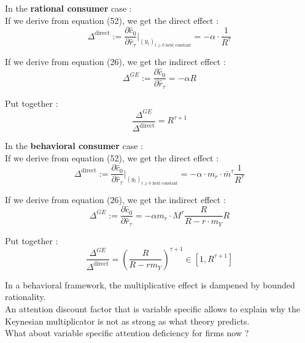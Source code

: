 \documentclass{beamer}
\begin{document}
\begin{frame}{\subsecname}
    In the \textbf{rational consumer} case : \\

    If we derive from equation (52), we get the direct effect : 
    \begin{equation*}
        \Delta^{\text{direct}}:=\frac{\partial \hat{c}_{0}}{\partial \hat{r}_{\tau}}\bigg\rvert_{(y_{t})_{t\geq0 \text{ held constant}}} = -\alpha\cdot \frac{1}{R^{\tau}}
    \end{equation*}
    
    If we derive from equation (26), we get the indirect effect :
    \begin{equation*}
        \Delta^{GE}:=\frac{\partial \hat{c}_{0}}{\partial \hat{r}_{\tau}}=-\alpha R 
    \end{equation*}

    Put together : 
    \begin{equation}\tag{53}
        \frac{\Delta^{GE}}{\Delta^{\text{direct}}}=R^{\tau+1}
    \end{equation}
\end{frame}

\begin{frame}{\subsecname}
    In the \textbf{behavioral consumer} case : \\

    If we derive from equation (52), we get the direct effect : 
    \begin{equation*}
        \Delta^{\text{direct}}:=\frac{\partial \hat{c}_{0}}{\partial \hat{r}_{\tau}}\bigg\rvert_{(y_{t})_{t\geq0 \text{ held constant}}} = -\alpha\cdot m_{r}\cdot\bar{m}^{\tau}\frac{1}{R^{\tau}}
    \end{equation*}

    If we derive from equation (26), we get the indirect effect :
    \begin{equation*}
        \Delta^{GE}:=\frac{\partial \hat{c}_{0}}{\partial \hat{r}_{\tau}}=-\alpha m_{r}\cdot M^{\tau} \frac{R}{R-r\cdot m_{Y}}R 
    \end{equation*}

    Put together : 
    \begin{equation}\tag{54}
        \frac{\Delta^{GE}}{\Delta^{\text{direct}}}=\left(\frac{R}{R-rm_{Y}}\right)^{\tau+1}\in\left[1, R^{\tau+1}\right]
    \end{equation}
\end{frame}

\begin{frame}{\subsecname}
    In a behavioral framework, the multiplicative effect is dampened by bounded rationality. \\

    An attention discount factor that is variable specific allows to explain why the Keynesian multiplicator is not as strong as what theory predicts. \\ 

    What about variable specific attention deficiency for firms now ?
\end{frame}
\end{document}
